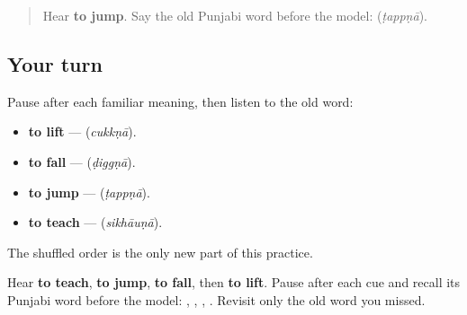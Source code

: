 \label{lesson:PA-R160-jump-again}



\begin{quote}
Hear \textbf{to jump}. Say the old Punjabi word before the model: \textbf{} (\emph{ṭappṇā}).
\end{quote}

\subsection*{Your turn}
Pause after each familiar meaning, then listen to the old word:

\begin{itemize}
\raggedright
  \item \textbf{to lift} — \textbf{} (\emph{cukkṇā}).
  \item \textbf{to fall} — \textbf{} (\emph{ḍiggṇā}).
  \item \textbf{to jump} — \textbf{} (\emph{ṭappṇā}).
  \item \textbf{to teach} — \textbf{} (\emph{sikhāuṇā}).
\end{itemize}

The shuffled order is the only new part of this practice.

\begin{tcolorbox}[breakable,colback=teal!4,colframe=teal!35!black,title={Before you move on}]
Hear \textbf{to teach}, \textbf{to jump}, \textbf{to fall}, then \textbf{to lift}. Pause after each cue and recall its Punjabi word before the model: \textbf{}, \textbf{}, \textbf{}, \textbf{}. Revisit only the old word you missed.
\end{tcolorbox}
